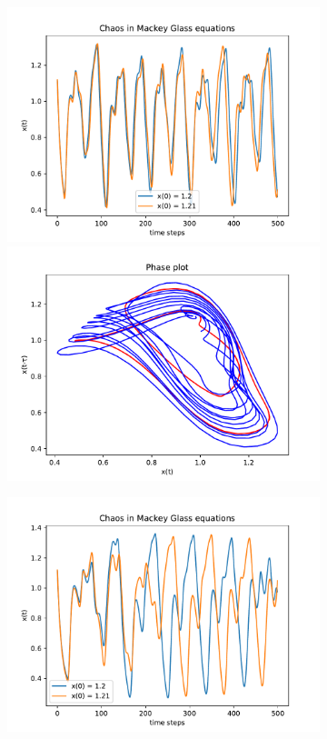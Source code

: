 \documentclass{article}
\begin{document}
\begin{figure}
    \centering
    \begin{subfigure}{.5\textwidth}
        \centering
        \includegraphics[width=\linewidth]{figures/mg_chaos_17.pdf}
        \includegraphics[width=\linewidth]{figures/17.pdf}
    \end{subfigure}
    \hspace{-6mm}
    \begin{subfigure}{.5\textwidth}
        \centering
        \includegraphics[width=\linewidth]{figures/mg_chaos_25.pdf}

\end{subfigure}
\end{figure}
\end{document}
